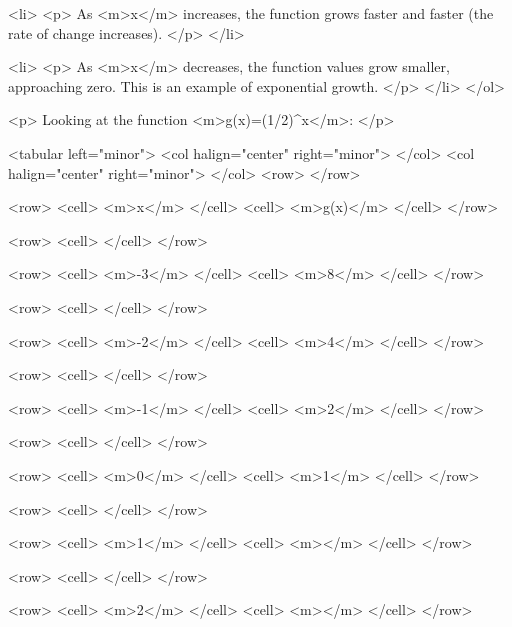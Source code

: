             <li>
                <p>
                    As <m>x</m> increases, the function grows faster and faster (the rate of change increases).
                </p>
            </li>

            <li>
                <p>
                    As <m>x</m> decreases, the function values grow smaller, approaching zero.
                    This is an example of exponential growth.
                </p>
            </li>
        </ol>

        <p>
            Looking at the function <m>g(x)=(1/2)^{x}</m>:
        </p>

        <tabular left="minor">
            <col halign="center" right="minor"> </col> <col halign="center" right="minor"> </col>
            <row>
            </row>

            <row>
                <cell> <m>x</m> </cell>
                <cell> <m>g(x)</m> </cell>
            </row>

            <row>
                <cell> </cell>
            </row>

            <row>
                <cell> <m>-3</m> </cell>
                <cell> <m>8</m> </cell>
            </row>

            <row>
                <cell> </cell>
            </row>

            <row>
                <cell> <m>-2</m> </cell>
                <cell> <m>4</m> </cell>
            </row>

            <row>
                <cell> </cell>
            </row>

            <row>
                <cell> <m>-1</m> </cell>
                <cell> <m>2</m> </cell>
            </row>

            <row>
                <cell> </cell>
            </row>

            <row>
                <cell> <m>0</m> </cell>
                <cell> <m>1</m> </cell>
            </row>

            <row>
                <cell> </cell>
            </row>

            <row>
                <cell> <m>1</m> </cell>
                <cell> <m></m> </cell>
            </row>

            <row>
                <cell> </cell>
            </row>

            <row>
                <cell> <m>2</m> </cell>
                <cell> <m></m> </cell>
            </row>

